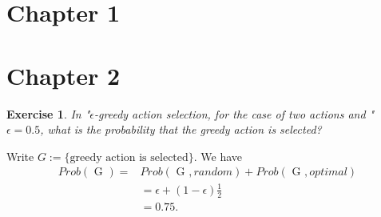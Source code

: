 \documentclass[answers]{exam}
\newtheorem{exercise}[theorem]{Exercise}
\theoremstyle{definition}
\theoremstyle{remark}
\begin{document}
\section{Chapter 1}

\section{Chapter 2}


\begin{exercise}
In "$\epsilon$-greedy action selection, for the case of two actions and " $\epsilon= 0.5$, what is
the probability that the greedy action is selected?
\end{exercise}
\begin{solution}
Write $G:=\{\text{greedy action is selected}\}$. We have
\begin{align*}
Prob(\text{ G })=&Prob(\text{ G },random)+Prob(\text{ G },optimal)    \\
&=\epsilon+(1-\epsilon)\frac{1}{2}\\
&=0.75.
\end{align*}  
\end{solution}
\end{document}
